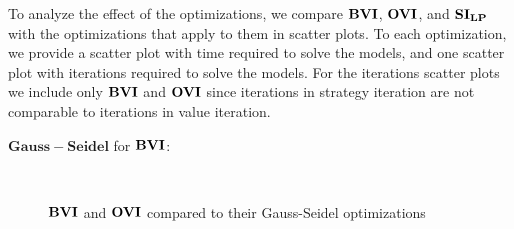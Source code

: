 To analyze the effect of the optimizations, we compare $\mathbf{BVI}$, $\mathbf{OVI}$, and $\mathbf{SI_{LP}}$ with the optimizations that apply to them in scatter plots.
To each optimization, we provide a scatter plot with time required to solve the models, and one scatter plot with iterations required to solve the models.
For the iterations scatter plots we include only $\mathbf{BVI}$ and $\mathbf{OVI}$ since iterations in strategy iteration are not comparable to iterations in value iteration.

$\mathbf{Gauss-Seidel}$ for $\mathbf{BVI}$:
\begin{figure}[h!]
    \centering
    \
    \caption{$\mathbf{BVI}$ and $\mathbf{OVI}$ compared to their Gauss-Seidel optimizations}%
    \label{fig:Scatter_G}%
    \end{figure}
\FloatBarrier


